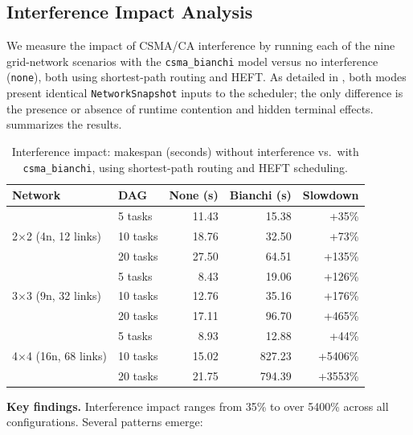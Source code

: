 \documentclass[conference]{IEEEtran}
\begin{document}
\subsection{Interference Impact Analysis}
\label{sec:interference_eval}

We measure the impact of CSMA/CA interference by running each of the nine
grid-network scenarios with the \texttt{csma\_bianchi} model versus no
interference (\texttt{none}), both using shortest-path routing and HEFT.
As detailed in , both modes present identical
\texttt{NetworkSnapshot} inputs to the scheduler; the only difference is the
presence or absence of runtime contention and hidden terminal effects.
 summarizes the results.

\begin{table}[t]
\centering
\caption{Interference impact: makespan (seconds) without interference vs.\
with \texttt{csma\_bianchi}, using shortest-path routing and HEFT scheduling.}
\label{tab:interference}
\begin{tabular}{@{}llrrr@{}}
\toprule
\textbf{Network} & \textbf{DAG} & \textbf{None (s)} & \textbf{Bianchi (s)} & \textbf{Slowdown} \\
\midrule
\multirow{3}{*}{2$\times$2 (4n, 12 links)}
  & 5 tasks   & 11.43  & 15.38  & +35\%   \\
  & 10 tasks  & 18.76  & 32.50  & +73\%   \\
  & 20 tasks  & 27.50  & 64.51  & +135\%  \\
\midrule
\multirow{3}{*}{3$\times$3 (9n, 32 links)}
  & 5 tasks   & 8.43   & 19.06  & +126\%  \\
  & 10 tasks  & 12.76  & 35.16  & +176\%  \\
  & 20 tasks  & 17.11  & 96.70  & +465\%  \\
\midrule
\multirow{3}{*}{4$\times$4 (16n, 68 links)}
  & 5 tasks   & 8.93   & 12.88  & +44\%   \\
  & 10 tasks  & 15.02  & 827.23 & +5406\% \\
  & 20 tasks  & 21.75  & 794.39 & +3553\% \\
\bottomrule
\end{tabular}
\end{table}

\textbf{Key findings.}
Interference impact ranges from 35\% to over 5400\% across all
configurations.  Several patterns emerge:
\end{document}
